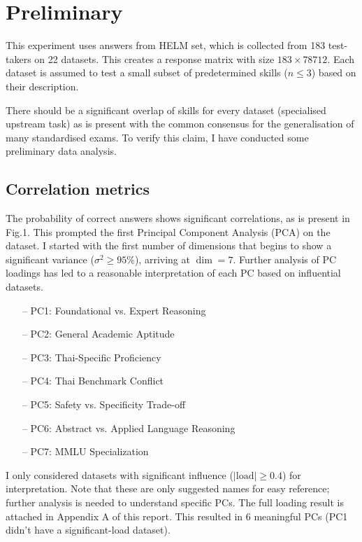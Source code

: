 \section{Preliminary}
This experiment uses answers from HELM set, which is collected from 183 test-takers on 22 datasets. This creates a response matrix with size $183 \times 78712$. Each dataset is assumed to test a small subset of predetermined skills ($n\le 3$) based on their description. 

There should be a significant overlap of skills for every dataset (specialised upstream task) as is present with the common consensus for the generalisation of many standardised exams. To verify this claim, I have conducted some preliminary data analysis.
\subsection{Correlation metrics}
The probability of correct answers shows significant correlations, as is present in Fig.1. This prompted the first Principal Component Analysis (PCA) on the dataset. I started with the first number of dimensions that begins to show a significant variance ($\sigma^2\ge 95\%$), arriving at $\dim=7$. Further analysis of PC loadings has led to a reasonable interpretation of each PC based on influential datasets.
\begin{itemize}
    \item [--] PC1: Foundational vs. Expert Reasoning
    \item [--] PC2: General Academic Aptitude
    \item [--] PC3: Thai-Specific Proficiency
    \item [--] PC4: Thai Benchmark Conflict
    \item [--] PC5: Safety vs. Specificity Trade-off
    \item [--] PC6: Abstract vs. Applied Language Reasoning
    \item [--] PC7: MMLU Specialization
\end{itemize}

I only considered datasets with significant influence ($|\text{load}| \ge 0.4$) for interpretation. Note that these are only suggested names for easy reference; further analysis is needed to understand specific PCs. The full loading result is attached in Appendix A of this report. This resulted in 6 meaningful PCs (PC1 didn't have a significant-load dataset).

